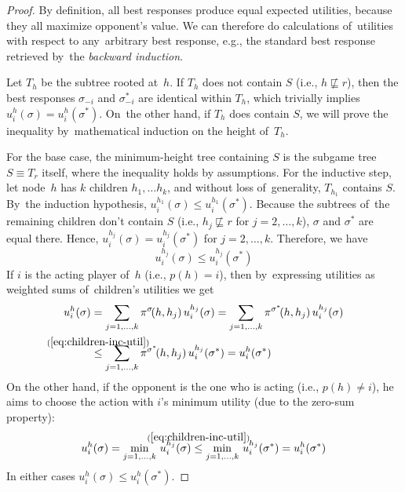 \begin{proof}
  By definition, all best responses produce equal expected utilities, because they all maximize opponent's value.
  We can therefore do calculations of~utilities with respect to any~arbitrary best response, e.g., the standard best response retrieved by~the \emph{backward induction}\footnotemark.

  Let $T_h$ be the subtree rooted at~$h$.
  If $T_h$ does not contain $S$ (i.e., $h \not\sqsubseteq r$), then the best responses $\sigma_{-i}$ and $\sigma^*_{-i}$ are identical within $T_h$, which trivially implies $u_i^h (\sigma) = u_i^h (\sigma^*)$.
  On~the other hand, if $T_h$ does contain $S$, we will prove the inequality by~mathematical induction on the height of~$T_h$.

  For the base case, the minimum-height tree containing $S$ is the subgame tree $S \equiv T_r$ itself, where the inequality holds by assumptions.
  For the inductive step, let node~$h$ has $k$ children $h_1, \dots h_k$, and without loss of~generality, $T_{h_1}$ contains $S$.
  By~the induction hypothesis, $u_i^{h_1} (\sigma) \le u_i^{h_1} (\sigma^*)$.
  Because the subtrees of~the remaining children don't contain $S$ (i.e., $h_j \not\sqsubseteq r$ for $j = 2, \dots, k$), $\sigma$ and $\sigma^*$ are equal there.
  Hence, $u_i^{h_j} (\sigma) = u_i^{h_j} (\sigma^*)$ for $j = 2, \dots, k$.
  Therefore, we have
  \begin{equation}
    \label{eq:children-inc-util}
    u_i^{h_j}(\sigma) \le u_i^{h_j}(\sigma^*)
  \end{equation}
  If $i$ is the acting player of~$h$ (i.e., $p(h) = i$), then by~expressing utilities as weighted sums of~children's utilities we get
  \begin{align*}
    u_i^h(\sigma)
    &= \sum _{j = 1, \dots, k} \pi^\sigma\!(h,h_j) \,u_i^{h_j}(\sigma)
    = \sum _{j = 1, \dots, k} \pi^{\sigma^*}\!(h,h_j) \,u_i^{h_j}(\sigma) \\
    &\stackrel{\mathclap{\mathrm{(\ref{eq:children-inc-util})}}} {\le}
    \sum _{j = 1, \dots, k} \pi^{\sigma^*}\!(h,h_j) \,u_i^{h_j}(\sigma^*)
    = u_i^h(\sigma^*)
  \end{align*}
  On the other hand, if the opponent is the one who is acting (i.e., $p(h) \ne i$), he aims to choose the action with $i$'s minimum utility (due to the zero-sum property):
  \begin{align*}
    u_i^h(\sigma)
    = \min _{j = 1, \dots, k} \,u_i^{h_j}(\sigma)
    \stackrel{\mathclap{\mathrm{(\ref{eq:children-inc-util})}}} {\le}
    \min _{j = 1, \dots, k} \,u_i^{h_j}(\sigma^*)
    = u_i^h(\sigma^*)
  \end{align*}
  In either cases $u_i^h(\sigma) \le u_i^h(\sigma^*)$.
\end{proof}

